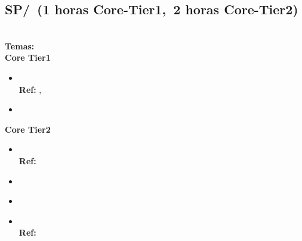 
\subsection{SP/\SPSocialContext~(1 horas Core-Tier1,~2 horas Core-Tier2)}\label{sec:BOK:SPSocialContext}
\SPSocialContextDescription\\
\noindent \textbf{Temas:}\\
\noindent \textbf{Core Tier1}
\begin{itemize}
	\item \SPSocialContextTopicSocial\xspace \\ \textbf{Ref:} , \label{sec:BOK:SPSocialContextTopicSocial}
	\item \SPSocialContextTopicImpact\label{sec:BOK:SPSocialContextTopicImpact}
\end{itemize}

\noindent \textbf{Core Tier2}
\begin{itemize}
	\item \SPSocialContextTopicGrowth\xspace \\ \textbf{Ref:} \label{sec:BOK:SPSocialContextTopicGrowth}
	\item \SPSocialContextTopicOften\label{sec:BOK:SPSocialContextTopicOften}
	\item \SPSocialContextTopicAccessibility\label{sec:BOK:SPSocialContextTopicAccessibility}
	\item \SPSocialContextTopicContext\xspace \\ \textbf{Ref:} \label{sec:BOK:SPSocialContextTopicContext}
\end{itemize}


